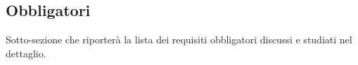 \subsection{Obbligatori}

Sotto-sezione che riporterà la lista dei requisiti obbligatori discussi e studiati nel dettaglio.
